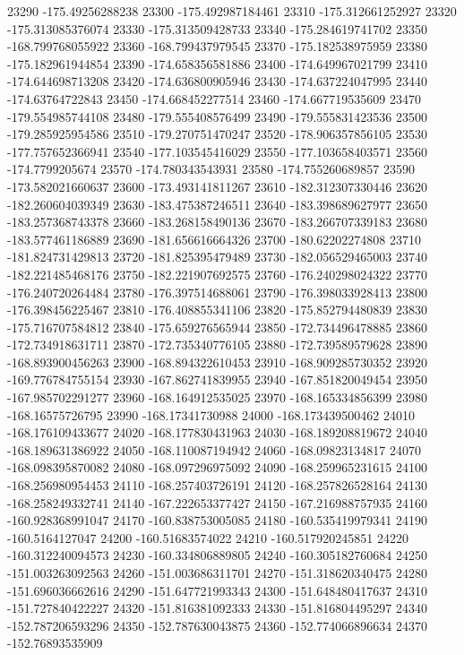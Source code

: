 {23290 -175.49256288238
23300 -175.492987184461
23310 -175.312661252927
23320 -175.313085376074
23330 -175.313509428733
23340 -175.284619741702
23350 -168.799768055922
23360 -168.799437979545
23370 -175.182538975959
23380 -175.182961944854
23390 -174.658356581886
23400 -174.649967021799
23410 -174.644698713208
23420 -174.636800905946
23430 -174.637224047995
23440 -174.63764722843
23450 -174.668452277514
23460 -174.667719535609
23470 -179.554985744108
23480 -179.555408576499
23490 -179.555831423536
23500 -179.285925954586
23510 -179.270751470247
23520 -178.906357856105
23530 -177.757652366941
23540 -177.103545416029
23550 -177.103658403571
23560 -174.7799205674
23570 -174.780343543931
23580 -174.755260689857
23590 -173.582021660637
23600 -173.493141811267
23610 -182.312307330446
23620 -182.260604039349
23630 -183.475387246511
23640 -183.398689627977
23650 -183.257368743378
23660 -183.268158490136
23670 -183.266707339183
23680 -183.577461186889
23690 -181.656616664326
23700 -180.62202274808
23710 -181.824731429813
23720 -181.825395479489
23730 -182.056529465003
23740 -182.221485468176
23750 -182.221907692575
23760 -176.240298024322
23770 -176.240720264484
23780 -176.397514688061
23790 -176.398033928413
23800 -176.398456225467
23810 -176.408855341106
23820 -175.852794480839
23830 -175.716707584812
23840 -175.659276565944
23850 -172.734496478885
23860 -172.734918631711
23870 -172.735340776105
23880 -172.739589579628
23890 -168.893900456263
23900 -168.894322610453
23910 -168.909285730352
23920 -169.776784755154
23930 -167.862741839955
23940 -167.851820049454
23950 -167.985702291277
23960 -168.164912535025
23970 -168.165334856399
23980 -168.16575726795
23990 -168.17341730988
24000 -168.173439500462
24010 -168.176109433677
24020 -168.177830431963
24030 -168.189208819672
24040 -168.189631386922
24050 -168.110087194942
24060 -168.09823134817
24070 -168.098395870082
24080 -168.097296975092
24090 -168.259965231615
24100 -168.256980954453
24110 -168.257403726191
24120 -168.257826528164
24130 -168.258249332741
24140 -167.222653377427
24150 -167.216988757935
24160 -160.928368991047
24170 -160.838753005085
24180 -160.535419979341
24190 -160.5164127047
24200 -160.51683574022
24210 -160.517920245851
24220 -160.312240094573
24230 -160.334806889805
24240 -160.305182760684
24250 -151.003263092563
24260 -151.003686311701
24270 -151.318620340475
24280 -151.696036662616
24290 -151.647721993343
24300 -151.648480417637
24310 -151.727840422227
24320 -151.816381092333
24330 -151.816804495297
24340 -152.787206593296
24350 -152.787630043875
24360 -152.774066896634
24370 -152.76893535909
}
